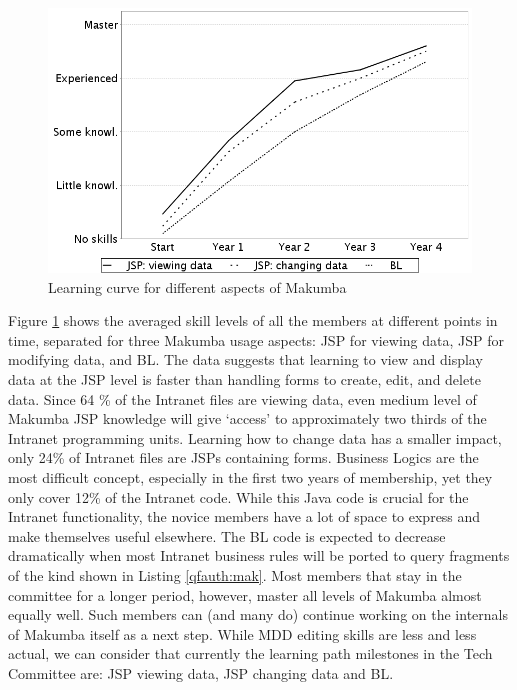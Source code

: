 \documentclass{chi2009}
\begin{document}
\begin{figure}[t]
  \label{fig:learning-technologies}
  \centering
  \includegraphics[width=0.7\columnwidth]{figures/learning-technologies}
  \caption{Learning curve for different aspects of Makumba}
\end{figure} 

Figure \ref{fig:learning-technologies} shows the averaged skill levels of all the members at different points in time, separated for three Makumba usage aspects: JSP for viewing data, JSP for modifying data, and BL. The data suggests that learning to view and display data at the JSP level is faster than handling forms to create, edit, and delete data. 
Since 64 \% of the Intranet files are viewing data, even medium level of Makumba JSP knowledge will give `access' to approximately two thirds of the Intranet programming units. 
Learning how to change data has a smaller impact, only 24\% of Intranet files are JSPs containing forms. 
Business Logics are the most difficult concept, especially in the first two years of membership, yet they only cover 12\% of the Intranet code. While this Java code is crucial for the Intranet functionality, the novice members have a lot of space to express and make themselves useful elsewhere. The BL code is expected to decrease dramatically when most Intranet business rules will be ported to query fragments of the kind shown in Listing \ref{qfauth:mak}.
Most members that stay in the committee for a longer period, however, master all levels of Makumba almost equally well. Such members can (and many do) continue working on the internals of Makumba itself  as a next step. While MDD editing skills are less and less actual, we can consider that currently the learning path milestones in the Tech Committee are: JSP viewing data, JSP changing data and BL.
\end{document}
